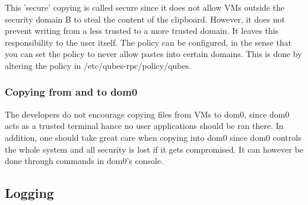 \documentclass[runningheads,a4paper]{article}
\begin{document}
 This 'secure' copying is called secure since it does not allow VMs
outside the security domain B to steal the content of the clipboard.
However, it does not prevent writing from a less trusted to a more
trusted domain.  It leaves this responsibility to the user itself.
The policy can be configured, in the sense that you can set the policy
to never allow pastes into certain domains.  This is done by altering
the policy in /etc/qubes-rpc/policy/qubes. 

\subsubsection{Copying from and to dom0} 


The developers do not encourage copying files from VMs to dom0, since
dom0 acts as a trusted terminal hance no user applications should be
ran there.  In addition, one should take great care when copying into
dom0 since dom0 controls the whole system and all security is lost if
it gets compromised.  It can however be done through commands in dom0's console.  

\subsection{Logging}
\end{document}
